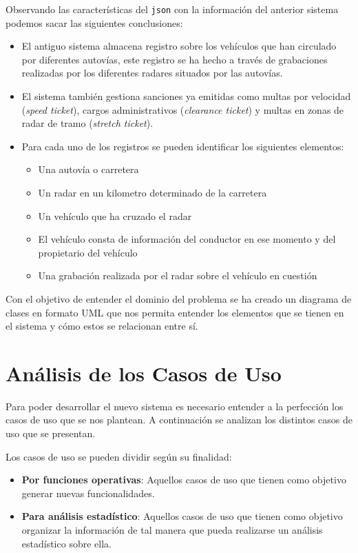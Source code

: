 \documentclass[]{article}
\begin{document}
Observando las características del \texttt{json} con la información del anterior sistema podemos sacar las siguientes conclusiones:
\begin{itemize}
    \item El antiguo sistema almacena registro sobre los vehículos que han circulado por diferentes autovías, este registro se ha hecho a través de grabaciones realizadas por los diferentes radares situados por las autovías.
    \item El sistema también gestiona sanciones ya emitidas como multas por velocidad (\textit{speed ticket}), cargos administrativos (\textit{clearance ticket}) y multas en zonas de radar de tramo (\textit{stretch ticket}).
    \item Para cada uno de los registros se pueden identificar los siguientes elementos:
    \begin{itemize}
        \item Una autovía o carretera
        \item Un radar en un kilometro determinado de la carretera
        \item Un vehículo que ha cruzado el radar
        \item El vehículo consta de información del conductor en ese momento y del propietario del vehículo
        \item Una grabación realizada por el radar sobre el vehículo en cuestión
    \end{itemize} 
\end{itemize}

Con el objetivo de entender el dominio del problema se ha creado un diagrama de clases en formato UML que nos permita entender los elementos que se tienen en el sistema y cómo estos se relacionan entre sí.

\section{Análisis de los Casos de Uso}
\label{sec:analisis_casos_de_uso}

Para poder desarrollar el nuevo sistema es necesario entender a la perfección
los casos de uso que se nos plantean. A continuación se analizan los
distintos casos de uso que se presentan.

Los casos de uso se pueden dividir según su finalidad:
\begin{itemize}
    \item \textbf{Por funciones operativas}: Aquellos casos de uso que tienen como objetivo generar nuevas funcionalidades.
    \item \textbf{Para análisis estadístico}: Aquellos casos de uso que tienen como objetivo organizar la información de tal manera que pueda realizarse un análisis estadístico sobre ella.
\end{itemize}
\end{document}

